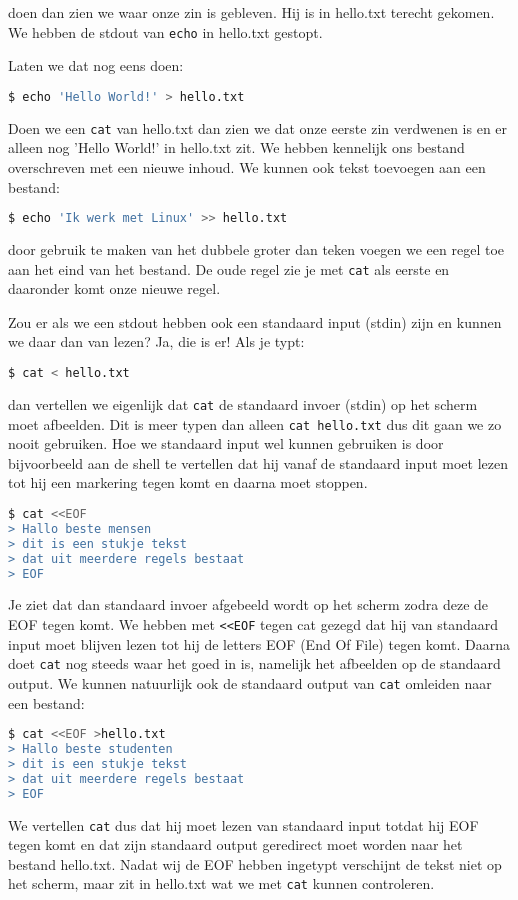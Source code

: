 doen dan zien we waar onze zin is gebleven. Hij is in hello.txt terecht gekomen. We hebben de stdout van \texttt{echo} in hello.txt gestopt.

Laten we dat nog eens doen:

\begin{lstlisting}[language=bash]
$ echo 'Hello World!' > hello.txt
\end{lstlisting}

Doen we een \texttt{cat} van hello.txt dan zien we dat onze eerste zin verdwenen is en er alleen nog 'Hello World!' in hello.txt zit. We hebben kennelijk ons bestand overschreven met een nieuwe inhoud. We kunnen ook tekst toevoegen aan een bestand:

\begin{lstlisting}[language=bash]
$ echo 'Ik werk met Linux' >> hello.txt
\end{lstlisting}

door gebruik te maken van het dubbele groter dan teken voegen we een regel toe aan het eind van het bestand. De oude regel zie je met \texttt{cat} als eerste en daaronder komt onze nieuwe regel.

Zou er als we een stdout hebben ook een standaard input (stdin) zijn en kunnen we daar dan van lezen? Ja, die is er! Als je
typt:

\begin{lstlisting}[language=bash]
$ cat < hello.txt
\end{lstlisting}

dan vertellen we eigenlijk dat \texttt{cat} de standaard invoer (stdin) op het scherm moet afbeelden. Dit is meer typen dan alleen \texttt{cat hello.txt} dus dit gaan we zo nooit gebruiken. Hoe we standaard input wel kunnen gebruiken is door bijvoorbeeld aan de shell te vertellen dat hij vanaf de standaard input moet lezen tot hij een markering tegen komt en daarna moet stoppen.
\begin{lstlisting}[language=bash]
$ cat <<EOF
> Hallo beste mensen
> dit is een stukje tekst
> dat uit meerdere regels bestaat
> EOF
\end{lstlisting}
Je ziet dat dan standaard invoer afgebeeld wordt op het scherm zodra deze de EOF tegen komt. We hebben met \texttt{<<EOF} tegen cat gezegd dat hij van standaard input moet blijven lezen tot hij de letters EOF (End Of File) tegen komt. Daarna doet \texttt{cat} nog steeds waar het goed in is, namelijk het afbeelden op de standaard output. We kunnen natuurlijk ook de standaard output van \texttt{cat} omleiden naar een bestand:
\begin{lstlisting}[language=bash]
$ cat <<EOF >hello.txt
> Hallo beste studenten
> dit is een stukje tekst
> dat uit meerdere regels bestaat
> EOF
\end{lstlisting}
We vertellen \texttt{cat} dus dat hij moet lezen van standaard input totdat hij EOF tegen komt en dat zijn standaard output geredirect moet worden naar het bestand hello.txt. Nadat wij de EOF hebben ingetypt verschijnt de tekst niet op het scherm, maar zit in hello.txt wat we met \texttt{cat} kunnen controleren.

